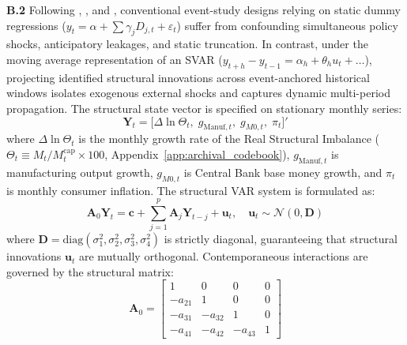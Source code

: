 \textbf{B.2} Following \citet{ChenFangLiu2021}, \citet{Wright2012}, and \citet{KilianLutkepohl2017}, conventional event-study designs relying on static dummy regressions ($y_t = \alpha + \sum \gamma_j D_{j,t} + \varepsilon_t$) suffer from confounding simultaneous policy shocks, anticipatory leakages, and static truncation. In contrast, under the moving average representation of an SVAR ($y_{t+h} - y_{t-1} = \alpha_h + \theta_h u_t + \dots$), projecting identified structural innovations across event-anchored historical windows isolates exogenous external shocks and captures dynamic multi-period propagation. The structural state vector is specified on stationary monthly series:
\begin{equation}
	\mathbf{Y}_t = \big[ \Delta \ln \Theta_t,\; g_{\text{Manuf},t},\; g_{M0,t},\; \pi_t \big]'
	\label{eq:app_b_svar_vector}
\end{equation}
where $\Delta \ln \Theta_t$ is the monthly growth rate of the Real Structural Imbalance ($\Theta_t \equiv M_t / M^{\text{cap}}_t \times 100$, Appendix~\ref{app:archival_codebook}), $g_{\text{Manuf},t}$ is manufacturing output growth, $g_{M0,t}$ is Central Bank base money growth, and $\pi_t$ is monthly consumer inflation. The structural VAR system is formulated as:
\begin{equation}
	\mathbf{A}_0 \mathbf{Y}_t = \mathbf{c} + \sum_{j=1}^p \mathbf{A}_j \mathbf{Y}_{t-j} + \mathbf{u}_t, \quad \mathbf{u}_t \sim \mathcal{N}(0, \mathbf{D})
	\label{eq:app_b_svar_system}
\end{equation}
where $\mathbf{D} = \text{diag}(\sigma_1^2, \sigma_2^2, \sigma_3^2, \sigma_4^2)$ is strictly diagonal, guaranteeing that structural innovations $\mathbf{u}_t$ are mutually orthogonal. Contemporaneous interactions are governed by the structural matrix:
\begin{equation}
	\mathbf{A}_0 = \begin{bmatrix} 1 & 0 & 0 & 0 \\ -a_{21} & 1 & 0 & 0 \\ -a_{31} & -a_{32} & 1 & 0 \\ -a_{41} & -a_{42} & -a_{43} & 1 \end{bmatrix}
	\label{eq:app_b_a0_matrix}
\end{equation}
